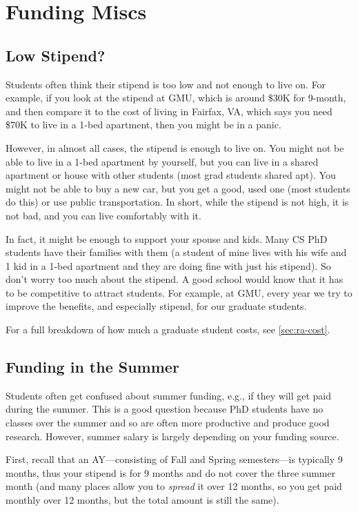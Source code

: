 \documentclass[oneside,11pt]{book}
\begin{document}
\section{Funding Miscs}

\subsection{Low Stipend?}\label{sec:low stipend}

Students often think their stipend is too low and not enough to live on.  For example, if you look at the stipend at GMU, which is around \$30K for 9-month, and then compare it to the cost of living in Fairfax, VA, which says you need \$70K to live in a 1-bed apartment, then you might be in a panic.

However,  in almost all cases, the stipend is enough to live on.  You might not be able to live in a 1-bed apartment by yourself, but you can live in a shared apartment or house with other students (most grad students shared apt).  You might not be able to buy a new car, but you get a good, used one (most students do this) or use public transportation.  In short, while the stipend is not high, it is not bad, and you can live comfortably with it.  

In fact, it might be enough to support your spouse and kids.  Many CS PhD students have their families with them (a student of mine lives with his wife and 1 kid in a 1-bed apartment and they are doing fine with just his stipend). So don't worry too much about the stipend.  A good school would know that it has to be competitive to attract students.  For example, at GMU, every year we try to improve the benefits, and especially stipend, for our graduate students.

For a full breakdown of how much a graduate student costs, see \autoref{sec:ra-cost}.


\subsection{Funding in the Summer}\label{sec:summer-funding}

Students often get confused about summer funding, e.g., if they will get paid during the summer.  This is a good question because PhD students have no classes over the summer and so are often more productive and produce good research. However, summer salary is largely depending on your funding source.

First, recall that an \acrfull{AY}---consisting of Fall and Spring semesters---is typically 9 months, thus your stipend is for 9 months and do not cover the three summer month (and many places allow you to \emph{spread} it over 12 months, so you get paid monthly over 12 months, but the total amount is still the same).
\end{document}
